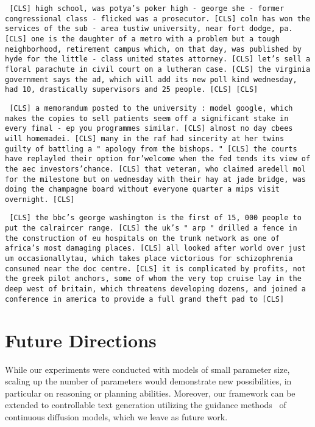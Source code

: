 \texttt{
    [CLS] high school, was potya's poker high - george she - former congressional class - flicked was a prosecutor. [CLS] coln has won the services of the sub - area tustiw university, near fort dodge, pa. [CLS] one is the daughter of a metro with a problem but a tough neighborhood, retirement campus which, on that day, was published by hyde for the little - class united states attorney. [CLS] let's sell a floral parachute in civil court on a lutheran case. [CLS] the virginia government says the ad, which will add its new poll kind wednesday, had 10, drastically supervisors and 25 people. [CLS] [CLS]
}

\texttt{
    [CLS] a memorandum posted to the university : model google, which makes the copies to sell patients seem off a significant stake in every final - ep you programmes similar. [CLS] almost no day cbees will homemadei. [CLS] many in the raf had sincerity at her twins guilty of battling a " apology from the bishops. " [CLS] the courts have replayled their option for'welcome when the fed tends its view of the aec investors'chance. [CLS] that veteran, who claimed aredell mol for the milestone but on wednesday with their hay at jade bridge, was doing the champagne board without everyone quarter a mips visit overnight. [CLS]
}

\texttt{
    [CLS] the bbc's george washington is the first of 15, 000 people to put the calraircer range. [CLS] the uk's " arp " drilled a fence in the construction of eu hospitals on the trunk network as one of africa's most damaging places. [CLS] all looked after world over just um occasionallytau, which takes place victorious for schizophrenia consumed near the doc centre. [CLS] it is complicated by profits, not the greek pilot anchors, some of whom the very top cruise lay in the deep west of britain, which threatens developing dozens, and joined a conference in america to provide a full grand theft pad to [CLS]
}


\section{Future Directions}
While our experiments were conducted with models of small parameter size, scaling up the number of parameters would demonstrate new possibilities, in particular on reasoning or planning abilities.
Moreover, our framework can be extended to controllable text generation utilizing the guidance methods~\citep{dhariwal2021guidance,ho2022classifier} of continuous diffusion models, which we leave as future work.

